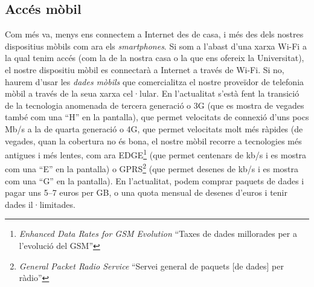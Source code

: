 \subsection{Accés mòbil}
Com més va, menys ens connectem a Internet des de casa, i més des dels
nostres dispositius mòbils com ara els \emph{smartphones}. Si som a
l'abast d'una xarxa Wi-Fi a la qual tenim accés (com la de la nostra
casa o la que ens ofereix la Universitat), el nostre dispositiu mòbil
es connectarà a Internet a través de Wi-Fi. Si no, haurem d'usar les
\emph{dades mòbils} que comercialitza el nostre proveïdor de telefonia
mòbil a través de la seua xarxa cel·lular. En l'actualitat s'està fent
la transició de la tecnologia anomenada de tercera generació o 3G (que
es mostra de vegades també com una ``H'' en la pantalla), que permet
velocitats de connexió d'uns pocs Mb/s a la de quarta generació o 4G,
que permet velocitats molt més ràpides (de vegades, quan la cobertura
no és bona, el nostre mòbil recorre a tecnologies més antigues i més
lentes, com ara EDGE\footnote{\emph{Enhanced Data Rates for GSM
    Evolution} ``Taxes de dades millorades per a l'evolució del GSM''}
(que permet centenars de kb/s i es mostra com una ``E'' en la
pantalla) o GPRS\footnote{\emph{General Packet Radio Service} ``Servei
  general de paquets [de dades] per ràdio''} (que permet desenes de
kb/s i es mostra com una ``G'' en la pantalla). En l'actualitat, podem
comprar paquets de dades i pagar uns 5--7 euros per GB, o una quota
mensual de desenes d'euros i tenir dades il·limitades.

